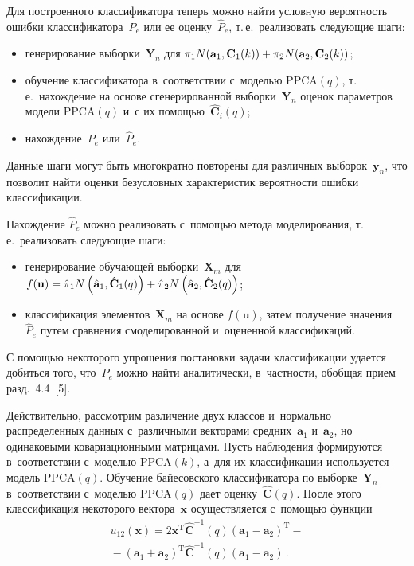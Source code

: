 \begin{multicols}{2}
     Для построенного классификатора теперь можно найти условную 
вероятность ошибки классификатора~$P_e$ или ее оценку~$\hat{P}_e$, т.\,е.\ 
реализовать следующие шаги:
     \begin{itemize}
\item генерирование выборки~$\mathbf{Y}_n$ для 
$\pi_1 N(\mathbf{a}_1,\mathbf{C}_1(k))\hm+ \pi_2 N(\mathbf{a}_2, 
\mathbf{C}_2(k))$;
\item обучение классификатора в~соответствии с~моделью PPCA$(q)$, т.\,е.\ 
нахождение на основе сгенерированной выборки~$\mathbf{Y}_n$ оценок 
параметров модели PPCA$(q)$ и~с их помощью~$\hat{\mathbf{C}}_i(q)$;
\item нахождение~$P_e$ или~$\hat{P}_e$.
\end{itemize}
     
     Данные шаги могут быть многократно повторены для различных 
выборок~$\mathbf{y}_n$, что позволит \mbox{найти} оценки безусловных 
характеристик вероятности ошибки классификации.
     
     Нахождение $\hat{P}_e$ можно реализовать с~помощью метода 
моделирования, т.\,е.\ реализовать следующие шаги:
     \begin{itemize}
\item генерирование обучающей выборки~$\mathbf{X}_m$ для 
$f(\mathbf{u})\hm= \hat{\pi}_1 N\left( \hat{\mathbf{a}}_1, 
\hat{\mathbf{C}}_1(q)\right) +\hat{\pi}_2 N\left( \hat{\mathbf{a}}_2, 
\hat{\mathbf{C}}_2(q)\right)$;
\item классификация элементов~$\mathbf{X}_m$ на основе $f(\mathbf{u})$, 
затем получение значения~$\hat{P}_e$ путем сравнения смоделированной 
и~оцененной классификаций.
\end{itemize}
     
     С помощью некоторого упрощения постановки задачи классификации 
удается добиться того, что~$P_e$ можно найти аналитически, в~част\-ности, 
обобщая прием разд.~4.4~[5].
     
     Действительно, рассмотрим различение двух классов   и~нормально 
распределенных данных с~различными векторами средних~$\mathbf{a}_1$ 
и~$\mathbf{a}_2$, но одинаковыми ковариационными матрицами. Пусть 
наблюдения формируются в~соответствии с~моделью PPCA$(k)$, а~для их 
классификации используется модель PPCA$(q)$. Обучение байесовского 
классификатора по выборке~$\mathbf{Y}_n$ в~соответствии с~моделью 
PPCA$(q)$ дает оценку~$\hat{\mathbf{C}}(q)$. После этого классификация 
некоторого вектора~$\mathbf{x}$ осуществляется с~помощью функции
     \begin{multline*}
     u_{12}(\mathbf{x}) =2\mathbf{x}^{\mathrm{T}} \hat{\mathbf{C}}^{-1}(q) 
\left( \mathbf{a}_1 - \mathbf{a}_2\right)^{\mathrm{T}}-{}\\
{}-\left( \mathbf{a}_1 
+\mathbf{a}_2\right)^{\mathrm{T}}\hat{\mathbf{C}}^{-1} (q) \left(\mathbf{a}_1-
\mathbf{a}_2\right)\,.
   \end{multline*}
     

\end{multicols}
